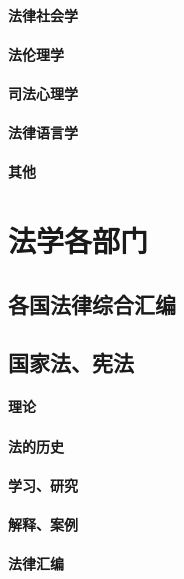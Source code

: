 \documentclass[UTF8]{../ApplicationUniverse}
\begin{document}
        \subsubsection{法律社会学}
        \subsubsection{法伦理学}
        \subsubsection{司法心理学}
        \subsubsection{法律语言学}
        \subsubsection{其他}





\chapter{法学各部门}
\section{各国法律综合汇编}
\section{国家法、宪法}
        \subsubsection{理论}
        \subsubsection{法的历史}
        \subsubsection{学习、研究}
        \subsubsection{解释、案例}
        \subsubsection{法律汇编}
\end{document}
